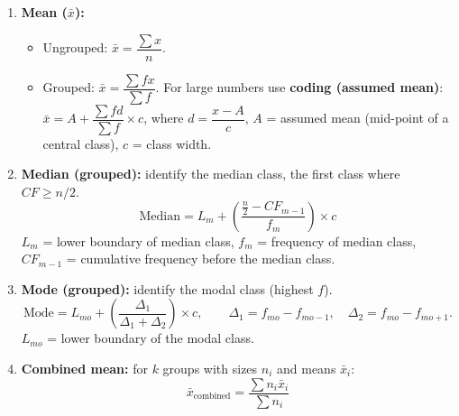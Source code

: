 \documentclass[11pt]{article}
\begin{document}
\begin{methode}
\begin{enumerate}
    \item \textbf{Mean ($\bar{x}$):}
    \begin{itemize}
        \item Ungrouped: $\bar{x} = \dfrac{\sum x}{n}$.
        \item Grouped: $\bar{x} = \dfrac{\sum fx}{\sum f}$. For large numbers use \textbf{coding (assumed mean)}: $\bar{x} = A + \dfrac{\sum fd}{\sum f} \times c$, where $d = \dfrac{x-A}{c}$, $A$ = assumed mean (mid-point of a central class), $c$ = class width.
    \end{itemize}
    \item \textbf{Median (grouped):} identify the median class, the first class where $CF \ge n/2$.
    \[ \text{Median} = L_m + \left( \frac{\frac{n}{2} - CF_{m-1}}{f_m} \right) \times c \]
    $L_m$ = lower boundary of median class, $f_m$ = frequency of median class, $CF_{m-1}$ = cumulative frequency before the median class.
    \item \textbf{Mode (grouped):} identify the modal class (highest $f$).
    \[ \text{Mode} = L_{mo} + \left( \frac{\Delta_1}{\Delta_1 + \Delta_2} \right) \times c, \qquad \Delta_1 = f_{mo} - f_{mo-1},\quad \Delta_2 = f_{mo} - f_{mo+1}. \]
    $L_{mo}$ = lower boundary of the modal class.
    \item \textbf{Combined mean:} for $k$ groups with sizes $n_i$ and means $\bar{x}_i$:
    \[ \bar{x}_{\text{combined}} = \frac{\sum n_i \bar{x}_i}{\sum n_i} \]
\end{enumerate}
\end{methode}
\end{document}
